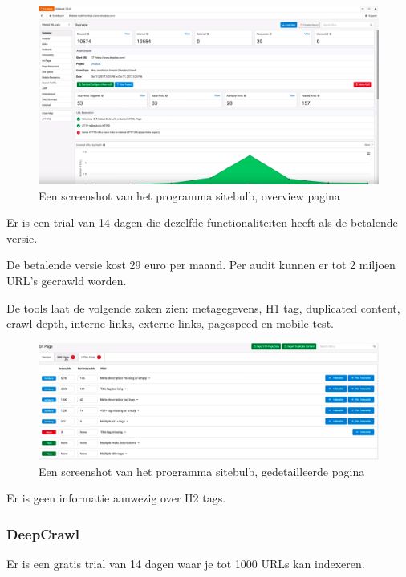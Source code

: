 \begin{figure}[h!]
\centering
\includegraphics[width=\linewidth]{img/sitebulb.PNG}
\caption{Een screenshot van het programma sitebulb, overview pagina
\autocite{sitebulb}}
\end{figure}

Er is een trial van 14 dagen die dezelfde functionaliteiten heeft als de betalende versie. 

De betalende versie kost 29 euro per maand. Per audit kunnen er tot 2 miljoen URL's gecrawld worden. 

De tools laat de volgende zaken zien: metagegevens, H1 tag, duplicated content, crawl depth, interne links, externe links, pagespeed en mobile test. 

\begin{figure}[h!]
\centering
\includegraphics[width=\linewidth]{img/sitebulb2.PNG}
\caption{Een screenshot van het programma sitebulb, gedetailleerde pagina
\autocite{sitebulb}}
\end{figure}

Er is geen informatie aanwezig over H2 tags.

\subsubsection{DeepCrawl}
\label{ch: DeepCrawl}
Er is een gratis trial van 14 dagen waar je tot 1000 URLs kan indexeren.

